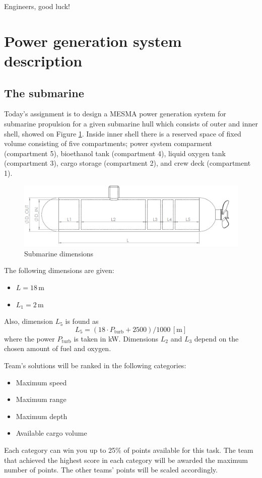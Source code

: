 \documentclass{article}
\begin{document}
	Engineers, good luck!
		
	\newpage
	\section{Power generation system description}
	
	
	\subsection{The submarine}
	
	Today's assignment is to design a MESMA power generation system for 
	submarine propulsion for a given submarine hull which consists of outer and 
	inner shell, showed on Figure \ref{fig:pwr_scheme}. Inside inner shell 
	there is a reserved space of fixed volume consisting of five compartments;
	power system comparment (compartment 5), bioethanol tank (compartment 4), 
	liquid oxygen tank (compartment 3), cargo storage (compartment 2), and crew 
	deck (compartment 1).
	
	
	\begin{figure}[h!]
		\centering
		\includegraphics[width=\textwidth]{submarine_side_view.png}
		\caption{Submarine dimensions}
		\label{fig:pwr_scheme}
	\end{figure}
	
	The following dimensions are given:
	\begin{itemize}
		\item $L = 18 \,\textrm{m}$
		\item $L_1 = 2 \,\textrm{m}$
	\end{itemize}
	Also, dimension $L_5$ is found as
	\begin{equation}
		L_5 = (18 \cdot P_\textrm{turb} + 2500)/1000 \,\left[\textrm{m}\right]
	\end{equation}
	where the power $P_\textrm{turb}$ is taken in kW. Dimensions $L_2$ and 
	$L_3$ depend on the chosen amount of fuel and oxygen.
	
	Team's solutions will be ranked in the following categories:
	\begin{itemize}
		\item Maximum speed
		\item Maximum range
		\item Maximum depth
		\item Available cargo volume
	\end{itemize}
    Each category can win you up to 25\% of points available for this task. The 
    team that achieved the highest score in each category will be awarded the 
    maximum number of points. The other teams' points will be scaled 
    accordingly.
\end{document}
